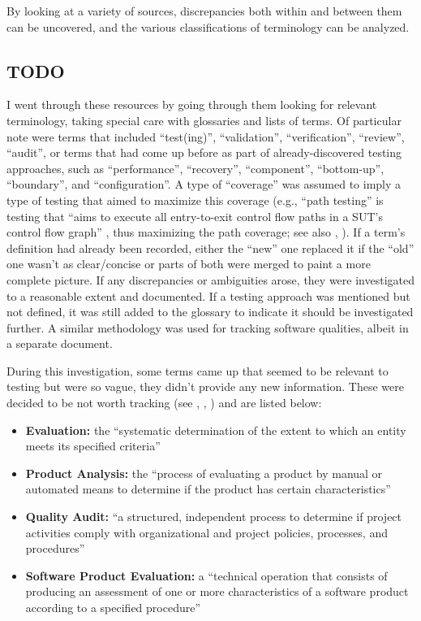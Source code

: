 By looking at a variety of sources, discrepancies both within and between them
can be uncovered, and the various classifications of terminology can be
analyzed.

\subsection{TODO}

I went through these resources by going through them looking for relevant
terminology, taking special care with glossaries and lists of terms. Of
particular note were terms that included ``test(ing)'', ``validation'',
``verification'', ``review'', ``audit'', or terms that had come up before
as part of already-discovered testing approaches, such as ``performance'',
``recovery'', ``component'', ``bottom-up'', ``boundary'', and ``configuration''.
A type of ``coverage'' was assumed to imply a type of testing that aimed to
maximize this coverage (e.g., ``path testing'' is testing that ``aims to
execute all entry-to-exit control flow paths in a SUT's control flow graph''
\citep[p.~5013]{SWEBOK2024}, thus maximizing the path coverage; see also
, \citet[Fig.~1]{SharmaEtAl2021}).
If a term's definition had already been recorded, either the ``new'' one
replaced it if the ``old'' one wasn't as clear/concise or parts of both were
merged to paint a more complete picture. If any discrepancies or ambiguities
arose, they were investigated to a reasonable extent and documented. If a
testing approach was mentioned but not defined, it was still added to the
glossary to indicate it should be investigated further. A similar methodology
was used for tracking software qualities, albeit in a separate
document.

During this investigation, some terms came up that seemed to be relevant to
testing but were so vague, they didn't provide any new information. These were
decided to be not worth tracking (see , ,
) and are listed below:

\begin{itemize}
      \item \textbf{Evaluation:} the ``systematic determination of the extent
            to which an entity meets its specified criteria''
            \citep[p.~167]{IEEE2017}
      \item \textbf{Product Analysis:} the ``process of evaluating a product by
            manual or automated means to determine if the product has certain
            characteristics'' \citep[p.~343]{IEEE2017}
      \item \textbf{Quality Audit:} ``a structured, independent process to
            determine if project activities comply with organizational and
            project policies, processes, and procedures'' \citep[p.~361]{IEEE2017}
      \item \textbf{Software Product Evaluation:} a ``technical operation that
            consists of producing an assessment of one or more characteristics
            of a software product according to a specified procedure''
            \citep[p.~424]{IEEE2017}
\end{itemize}

